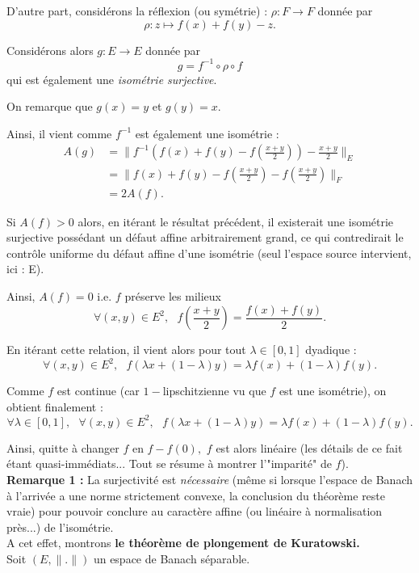 D'autre part, considérons la réflexion (ou symétrie) : $\rho : F \rightarrow F$ donnée par $$\rho : z \mapsto f(x)+f(y)-z.$$

Considérons alors $g : E \rightarrow E$ donnée par $$g=f^{-1}\circ \rho\circ f$$ qui est également une \emph{isométrie surjective}. 

On remarque que $g(x)=y$ et $g(y)=x.$

Ainsi, il vient comme $f^{-1}$ est également une isométrie : 
\begin{align*}
A(g) & = \|f^{-1}\left( f(x)+f(y)-f(\frac{x+y}{2})\right)-\frac{x+y}{2}\|_{E}\\
& = \|f(x)+f(y)-f(\frac{x+y}{2})-f(\frac{x+y}{2})\|_{F}\\
& = 2A(f).
\end{align*}

Si $A(f)>0$ alors, en itérant le résultat précédent, il existerait une isométrie surjective possédant un défaut affine arbitrairement grand, ce qui contredirait le contrôle uniforme du défaut affine d'une isométrie (seul l'espace source intervient, ici : E).

Ainsi, $A(f)=0$ i.e. $f$ préserve les milieux $$\forall (x,y)\in E^{2},\mbox{ } f(\frac{x+y}{2})=\frac{f(x)+f(y)}{2}.$$

En itérant cette relation, il vient alors pour tout $\lambda\in[0,1]$ dyadique : $$\forall (x,y)\in E^{2},\mbox{ } f(\lambda x + (1-\lambda)y)=\lambda f(x)+(1-\lambda)f(y).$$

Comme $f$ est continue (car $1-$lipschitzienne vu que $f$ est une isométrie), on obtient finalement : $$\forall\lambda\in[0,1],\mbox{ }\forall (x,y)\in E^{2},\mbox{ } f(\lambda x + (1-\lambda)y)=\lambda f(x)+(1-\lambda)f(y).$$

Ainsi, quitte à changer $f$ en $f-f(0),$ $f$ est alors linéaire (les détails de ce fait étant quasi-immédiats... Tout se résume à montrer l'"imparité" de $f$).\\


\textbf{Remarque 1 :} La surjectivité est \emph{nécessaire} (même si lorsque l'espace de Banach à l'arrivée a une norme strictement convexe, la conclusion du théorème reste vraie) pour pouvoir conclure au caractère affine (ou linéaire à normalisation près...) de l'isométrie.\\

A cet effet, montrons \textbf{le théorème de plongement de Kuratowski.}\\

Soit $(E,\|.\|)$ un espace de Banach séparable.

